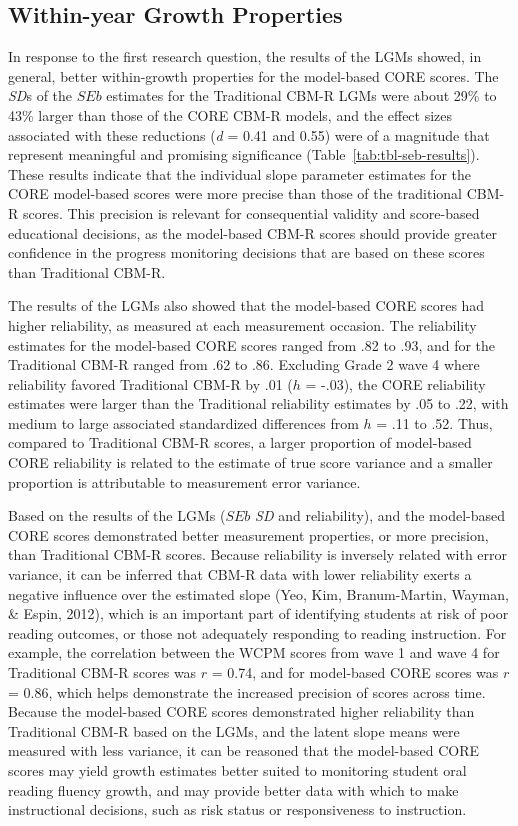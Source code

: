 \documentclass[
  english,
  man, fleqn, noextraspace]{apa6}
\begin{document}
\hypertarget{within-year-growth-properties}{%
\subsection{Within-year Growth Properties}\label{within-year-growth-properties}}

In response to the first research question, the results of the LGMs showed, in general, better within-growth properties for the model-based CORE scores. The \emph{SD}s of the \(SEb\) estimates for the Traditional CBM-R LGMs were about 29\% to 43\% larger than those of the CORE CBM-R models, and the effect sizes associated with these reductions (\emph{d} = 0.41 and 0.55) were of a magnitude that represent meaningful and promising significance (Table~\ref{tab:tbl-seb-results}). These results indicate that the individual slope parameter estimates for the CORE model-based scores were more precise than those of the traditional CBM-R scores. This precision is relevant for consequential validity and score-based educational decisions, as the model-based CBM-R scores should provide greater confidence in the progress monitoring decisions that are based on these scores than Traditional CBM-R.

The results of the LGMs also showed that the model-based CORE scores had higher reliability, as measured at each measurement occasion. The reliability estimates for the model-based CORE scores ranged from .82 to .93, and for the Traditional CBM-R ranged from .62 to .86. Excluding Grade 2 wave 4 where reliability favored Traditional CBM-R by .01 (\(h\) = -.03), the CORE reliability estimates were larger than the Traditional reliability estimates by .05 to .22, with medium to large associated standardized differences from \(h\) = .11 to .52. Thus, compared to Traditional CBM-R scores, a larger proportion of model-based CORE reliability is related to the estimate of true score variance and a smaller proportion is attributable to measurement error variance.

Based on the results of the LGMs (\(SEb\) \emph{SD} and reliability), and the model-based CORE scores demonstrated better measurement properties, or more precision, than Traditional CBM-R scores. Because reliability is inversely related with error variance, it can be inferred that CBM-R data with lower reliability exerts a negative influence over the estimated slope (Yeo, Kim, Branum-Martin, Wayman, \& Espin, 2012), which is an important part of identifying students at risk of poor reading outcomes, or those not adequately responding to reading instruction. For example, the correlation between the WCPM scores from wave 1 and wave 4 for Traditional CBM-R scores was \(r\) = 0.74, and for model-based CORE scores was \(r\) = 0.86, which helps demonstrate the increased precision of scores across time. Because the model-based CORE scores demonstrated higher reliability than Traditional CBM-R based on the LGMs, and the latent slope means were measured with less variance, it can be reasoned that the model-based CORE scores may yield growth estimates better suited to monitoring student oral reading fluency growth, and may provide better data with which to make instructional decisions, such as risk status or responsiveness to instruction.
\end{document}
